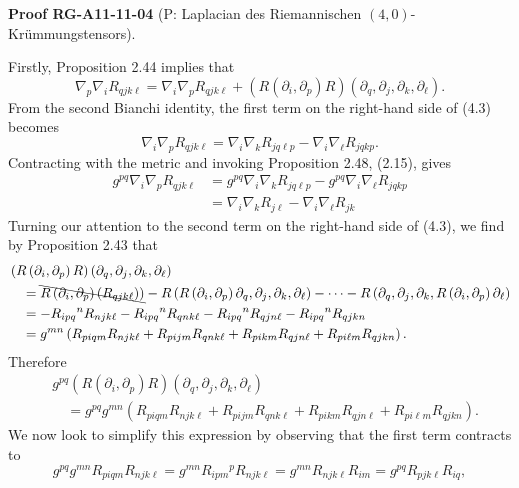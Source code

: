 \documentclass[10pt, letterpaper]{article}
\newcommand{\CustomHeading}[3]{%
  \par\medskip\noindent%
  \textbf{#1 #2} \textnormal{(#3)}.\enskip%
}
\newenvironment{PROOF}[2]{\begin{unitbox}\CustomHeading{Proof}{#1}{#2}}{\end{unitbox}}
\begin{document}
\begin{PROOF}{RG-A11-11-04}{P: Laplacian des Riemannischen $(4,0)$-Krümmungstensors}
Firstly, Proposition 2.44 implies that
$$
\nabla_{p} \nabla_{i} R_{q j k \ell}=\nabla_{i} \nabla_{p} R_{q j k \ell}+\left(R\left(\partial_{i}, \partial_{p}\right) R\right)\left(\partial_{q}, \partial_{j}, \partial_{k}, \partial_{\ell}\right) .
$$
From the second Bianchi identity, the first term on the right-hand side of (4.3) becomes
$$
\nabla_{i} \nabla_{p} R_{q j k \ell}=\nabla_{i} \nabla_{k} R_{j q \ell p}-\nabla_{i} \nabla_{\ell} R_{j q k p} .
$$
Contracting with the metric and invoking Proposition 2.48, (2.15), gives
$$
\begin{aligned}
g^{p q} \nabla_{i} \nabla_{p} R_{q j k \ell} & =g^{p q} \nabla_{i} \nabla_{k} R_{j q \ell p}-g^{p q} \nabla_{i} \nabla_{\ell} R_{j q k p} \\
& =\nabla_{i} \nabla_{k} R_{j \ell}-\nabla_{i} \nabla_{\ell} R_{j k}
\end{aligned}
$$
Turning our attention to the second term on the right-hand side of (4.3), we find by Proposition 2.43 that
$$
\begin{aligned}
& \left(R\left(\partial_{i}, \partial_{p}\right) R\right)\left(\partial_{q}, \partial_{j}, \partial_{k}, \partial_{\ell}\right) \\
& \quad=\bcancel{R\left(\partial_{i}, \partial_{p}\right)\left(R_{q j k \ell}\right))}-R\left(R\left(\partial_{i}, \partial_{p}\right) \partial_{q}, \partial_{j}, \partial_{k}, \partial_{\ell}\right)-\cdots-R\left(\partial_{q}, \partial_{j}, \partial_{k}, R\left(\partial_{i}, \partial_{p}\right) \partial_{\ell}\right) \\
& \quad=-R_{i p q}{ }^{n} R_{n j k \ell}-R_{i p q}{ }^{n} R_{q n k \ell}-R_{i p q}{ }^{n} R_{q j n \ell}-R_{i p q}{ }^{n} R_{q j k n} \\
& \quad=g^{m n}\left(R_{p i q m} R_{n j k \ell}+R_{p i j m} R_{q n k \ell}+R_{p i k m} R_{q j n \ell}+R_{p i \ell m} R_{q j k n}\right) .
\end{aligned}
$$
Therefore
$$
\begin{aligned}
& g^{p q}\left(R\left(\partial_{i}, \partial_{p}\right) R\right)\left(\partial_{q}, \partial_{j}, \partial_{k}, \partial_{\ell}\right) \\
& \quad=g^{p q} g^{m n}\left(R_{p i q m} R_{n j k \ell}+R_{p i j m} R_{q n k \ell}+R_{p i k m} R_{q j n \ell}+R_{p i \ell m} R_{q j k n}\right) .
\end{aligned}
$$
We now look to simplify this expression by observing that the first term contracts to
$$
g^{p q} g^{m n} R_{p i q m} R_{n j k \ell}=g^{m n} R_{i p m}{ }^{p} R_{n j k \ell}=g^{m n} R_{n j k \ell} R_{i m}=g^{p q} R_{p j k \ell} R_{i q},
$$
\end{PROOF}
\end{document}

